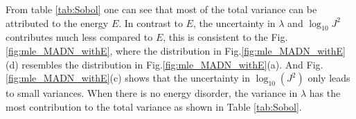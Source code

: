 \documentclass[%
 reprint,
superscriptaddress,
 amsmath,amssymb,
 aps,
prb,
floatfix
]{revtex4-2}
\begin{document}
From table \ref{tab:Sobol} one can see that most of the total variance can be attributed to the energy $E$. In contrast to $E$, the uncertainty in $\lambda$ and $\log_{10} J^2$ contributes much less compared to $E$, this is consistent to the Fig.\ref{fig:mle_MADN_withE}, where the distribution in Fig.\ref{fig:mle_MADN_withE}(d) resembles the distribution in Fig.\ref{fig:mle_MADN_withE}(a).
And Fig.\ref{fig:mle_MADN_withE}(c) shows that the uncertainty in $\log_{10}(J^2)$ only leads to small variances.
When there is no energy disorder, the variance in $\lambda$ has the most contribution to the total variance as shown in Table \ref{tab:Sobol}.

%
%
%


\end{document}
